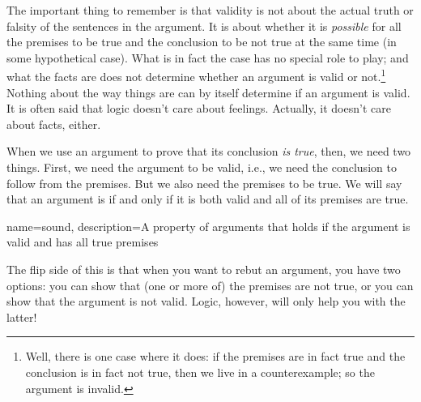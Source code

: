 The important thing to remember is that validity is not about the actual truth or falsity of the sentences in the argument. It is about whether it is \emph{possible} for all the premises to be true and the conclusion to be not true at the same time (in some hypothetical case). What is in fact the case has no special role to play; and what the facts are does not determine whether an argument is valid or not.\footnote{Well, there is one case where it does: if the premises are in fact true and the conclusion is in fact not true, then we live in a counterexample; so the argument is invalid.} Nothing about the way things are can by itself determine if an argument is valid. It is often said that logic doesn't care about feelings. Actually, it doesn't care about facts, either.

When we use an argument to prove that its conclusion \emph{is true}, then, we need two things. First, we need the argument to be valid, i.e., we need the conclusion to follow from the premises. But we also need the premises to be true. We will say that an argument is  if and only if it is both valid and all of its premises are true.

{
name=sound,
description={A property of arguments that holds if the argument is valid and has all true premises}
}

The flip side of this is that when you want to rebut an argument, you have two options: you can show that (one or more of) the premises are not true, or you can show that the argument is not valid.  Logic, however, will only help you with the latter!  

